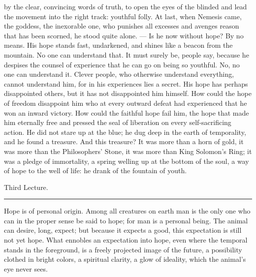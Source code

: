 \documentclass[12pt,a4paper,openany]{book}
\newcommand{\opage}[1]{\marginnote{\footnotesize\textit{[#1]}}}
\newcommand{\lecture}[1]{\clearpage\phantomsection\addcontentsline{toc}{chapter}{#1}\begin{center}{\large #1}\\[0.4em]\rule{3em}{0.4pt}\end{center}\medskip\noindent}
\begin{document}
by the clear, convincing words of truth, to open the
eyes of the blinded and lead the movement into the right track:
youthful folly. At last, when Nemesis came,
the goddess, the inexorable one, who punishes all excesses
and avenges reason that has been scorned, he stood quite alone.
--- Is he now without hope? By no means. His hope
stands fast, undarkened, and shines like a beacon from the mountain.
No one can understand that. It must surely be, people say,
because he despises the counsel of experience that he
can go on being so youthful. No, no one can
understand it. Clever people, who otherwise understand
everything, cannot understand him, for in his
experiences lies a secret. His hope has
perhaps disappointed others, but it has not disappointed him
himself. How could the hope of freedom disappoint him who
at every outward defeat had experienced that he
won an inward victory. How could the faithful hope fail him,
the hope that made him eternally free and pressed
the seal of liberation on every self-sacrificing action. He
did not stare up at the blue; he dug deep in
the earth of temporality, and he found a treasure. And this
treasure? It was more than a horn of gold, it
was more than the Philosophers' Stone, it was more than King
Solomon's Ring; it was a pledge of immortality, a spring
welling up at the bottom of the soul, a way of hope to the well of life:
he drank of the fountain of youth.

\setcounter{footnote}{0}%
\lecture{Third Lecture.}\opage{35}Hope is of personal origin. Among all creatures
on earth man is the only one who can in the proper sense be said to hope; for man
is a personal being. The animal can desire, long, expect; but because it expects a good,
this expectation is still not yet hope. What ennobles an expectation into hope, even where
the temporal stands in the foreground, is a freely projected image of the future, a
possibility clothed in bright colors, a spiritual clarity, a glow of ideality, which the
animal's eye never sees.
\end{document}
